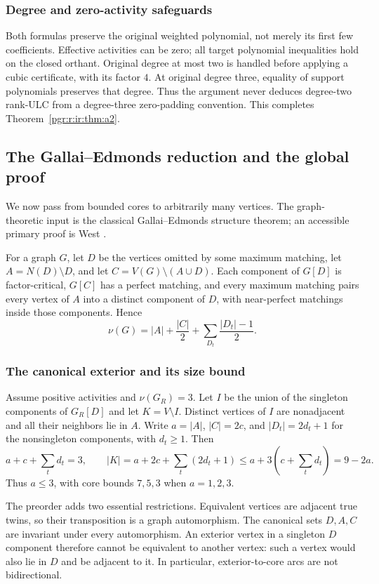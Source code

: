 \documentclass[11pt]{article}
\numberwithin{equation}{section}
\theoremstyle{definition}\newtheorem{definition}[theorem]{Definition}\newtheorem{remark}[theorem]{Remark}
\begin{document}
\subsubsection{Degree and zero-activity safeguards}
Both formulas preserve the original weighted polynomial, not merely its first few coefficients. Effective activities can be zero; all target polynomial inequalities hold on the closed orthant. Original degree at most two is handled before applying a cubic certificate, with its factor $4$. At original degree three, equality of support polynomials preserves that degree. Thus the argument never deduces degree-two rank-ULC from a degree-three zero-padding convention. This completes Theorem~\ref{pgr:r:ir:thm:a2}.

\subsection{The Gallai--Edmonds reduction and the global proof}\label{pgr:r:ir:sec:ge}
We now pass from bounded cores to arbitrarily many vertices. The graph-theoretic input is the classical Gallai--Edmonds structure theorem; an accessible primary proof is West \cite[Theorem 5]{West}.

For a graph $G$, let $D$ be the vertices omitted by some maximum matching, let $A=N(D)\setminus D$, and let $C=V(G)\setminus(A\cup D)$. Each component of $G[D]$ is factor-critical, $G[C]$ has a perfect matching, and every maximum matching pairs every vertex of $A$ into a distinct component of $D$, with near-perfect matchings inside those components. Hence
\begin{equation}\label{pgr:r:ir:eq:gebudget}
 \nu(G)=|A|+\frac{|C|}{2}+\sum_{D_t}\frac{|D_t|-1}{2}.
\end{equation}

\subsubsection{The canonical exterior and its size bound}
Assume positive activities and $\nu(G_R)=3$. Let $I$ be the union of the singleton components of $G_R[D]$ and let $K=V\setminus I$. Distinct vertices of $I$ are nonadjacent and all their neighbors lie in $A$. Write $a=|A|$, $|C|=2c$, and $|D_t|=2d_t+1$ for the nonsingleton components, with $d_t\ge1$. Then
\[
 a+c+\sum_t d_t=3,
 \qquad
 |K|=a+2c+\sum_t(2d_t+1)\le a+3\left(c+\sum_t d_t\right)=9-2a.
\]
Thus $a\le3$, with core bounds $7,5,3$ when $a=1,2,3$.

The preorder adds two essential restrictions. Equivalent vertices are adjacent true twins, so their transposition is a graph automorphism. The canonical sets $D,A,C$ are invariant under every automorphism. An exterior vertex in a singleton $D$ component therefore cannot be equivalent to another vertex: such a vertex would also lie in $D$ and be adjacent to it. In particular, exterior-to-core arcs are not bidirectional.
\end{document}
